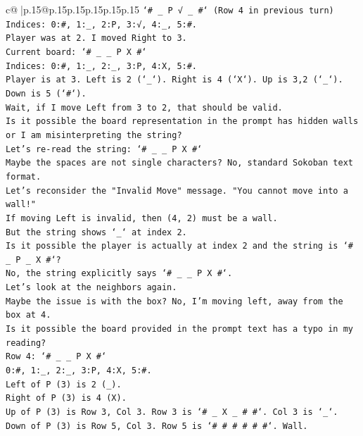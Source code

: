 \documentclass{article}
\begin{document}
{\begin{supertabular}{c@{$\;$}|p{.15\linewidth}@{}p{.15\linewidth}p{.15\linewidth}p{.15\linewidth}p{.15\linewidth}p{.15\linewidth}}
{{{\texttt{`\# \_ P √ \_ \#` (Row 4 in previous turn)} \\
\texttt{Indices: 0:\#, 1:\_, 2:P, 3:√, 4:\_, 5:\#.} \\
\texttt{Player was at 2. I moved Right to 3.} \\
\texttt{Current board: `\# \_ \_ P X \#`} \\
\texttt{Indices: 0:\#, 1:\_, 2:\_, 3:P, 4:X, 5:\#.} \\
\texttt{Player is at 3. Left is 2 (`\_`). Right is 4 (`X`). Up is 3,2 (`\_`). Down is 5 (`\#`).} \\
\texttt{Wait, if I move Left from 3 to 2, that should be valid.} \\
\texttt{Is it possible the board representation in the prompt has hidden walls or I am misinterpreting the string?} \\
\texttt{Let's re{-}read the string: `\# \_ \_ P X \#`} \\
\texttt{Maybe the spaces are not single characters? No, standard Sokoban text format.} \\
\texttt{Let's reconsider the "Invalid Move" message. "You cannot move into a wall!"} \\
\texttt{If moving Left is invalid, then (4, 2) must be a wall.} \\
\texttt{But the string shows `\_` at index 2.} \\
\texttt{Is it possible the player is actually at index 2 and the string is `\# \_ P \_ X \#`?} \\
\texttt{No, the string explicitly says `\# \_ \_ P X \#`.} \\
\texttt{Let's look at the neighbors again.} \\
\texttt{Maybe the issue is with the box? No, I'm moving left, away from the box at 4.} \\
\texttt{Is it possible the board provided in the prompt text has a typo in my reading?} \\
\texttt{Row 4: `\# \_ \_ P X \#`} \\
\texttt{0:\#, 1:\_, 2:\_, 3:P, 4:X, 5:\#.} \\
\texttt{Left of P (3) is 2 (\_).} \\
\texttt{Right of P (3) is 4 (X).} \\
\texttt{Up of P (3) is Row 3, Col 3. Row 3 is `\# \_ X \_ \# \#`. Col 3 is `\_`.} \\
\texttt{Down of P (3) is Row 5, Col 3. Row 5 is `\# \# \# \# \# \#`. Wall.} \\
\\ 
}}}
\end{supertabular}}
\end{document}
